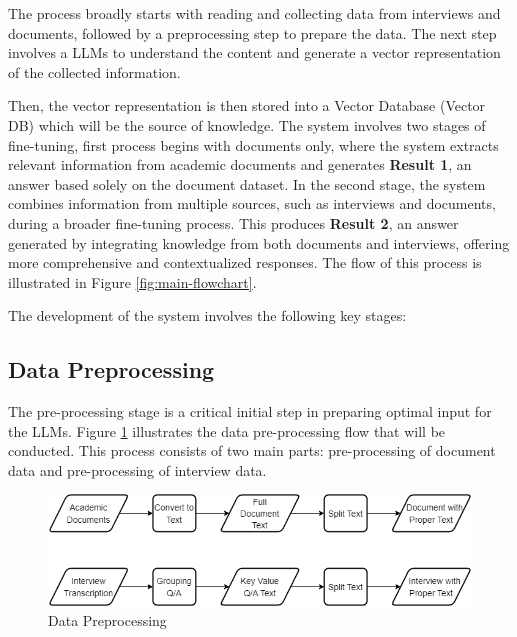 \documentclass[runningheads]{llncs}
\begin{document}
The process broadly starts with reading and collecting data from interviews and documents, followed by a preprocessing step to prepare the data. The next step involves a LLMs to understand the content and generate a vector representation of the collected information. 

Then, the vector representation is then stored into a Vector Database (Vector DB) which will be the source of knowledge. The system involves two stages of fine-tuning, first process begins with documents only, where the system extracts relevant information from academic documents and generates \textbf{Result 1}, an answer based solely on the document dataset. In the second stage, the system combines information from multiple sources, such as interviews and documents, during a broader fine-tuning process. This produces \textbf{Result 2}, an answer generated by integrating knowledge from both documents and interviews, offering more comprehensive and contextualized responses. The flow of this process is illustrated in Figure \ref{fig:main-flowchart}.

The development of the system involves the following key stages:
\subsection{Data Preprocessing}
The pre-processing stage is a critical initial step in preparing optimal input for the LLMs. Figure \ref{fig:preprocessing} illustrates the data pre-processing flow that will be conducted. This process consists of two main parts: pre-processing of document data and pre-processing of interview data.

\begin{figure}[htbp]
        \centerline{\includegraphics[scale=0.4]{eng-preproc.png}}
        \caption{Data Preprocessing}
        \label{fig:preprocessing}
    \end{figure}
    
\end{document}
